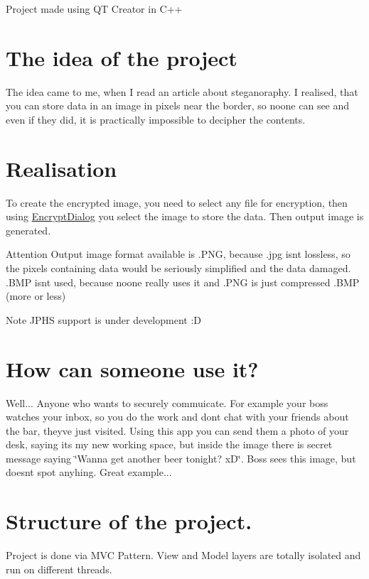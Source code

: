 Project made using QT Creator in C++\hypertarget{index_idea}{}\section{The idea of the project}\label{index_idea}
The idea came to me, when I read an article about steganoraphy. I realised, that you can store data in an image in pixels near the border, so noone can see and even if they did, it is practically impossible to decipher the contents. \hypertarget{index_real}{}\section{Realisation}\label{index_real}
To create the encrypted image, you need to select any file for encryption, then using \mbox{\hyperlink{class_encrypt_dialog}{Encrypt\+Dialog}} you select the image to store the data. Then output image is generated. \begin{DoxyAttention}{Attention}
Output image format available is .P\+NG, because .jpg isn\textquotesingle{}t lossless, so the pixels containing data would be seriously simplified and the data damaged. .B\+MP isn\textquotesingle{}t used, because noone really uses it and .P\+NG is just compressed .B\+MP (more or less) 
\end{DoxyAttention}
\begin{DoxyNote}{Note}
J\+P\+HS support is under development \+:D
\end{DoxyNote}
\hypertarget{index_use}{}\section{How can someone use it?}\label{index_use}
Well... Anyone who wants to securely commuicate. For example your boss watches your inbox, so you do the work and don\textquotesingle{}t chat with your friends about the bar, they\textquotesingle{}ve just visited. Using this app you can send them a photo of your desk, saying it\textquotesingle{}s my new working space, but inside the image there is secret message saying \char`\"{}\+Wanna get another beer tonight? x\+D\char`\"{}. Boss sees this image, but doesn\textquotesingle{}t spot anyhing. Great example... \hypertarget{index_structure}{}\section{Structure of the project.}\label{index_structure}
Project is done via M\+VC Pattern. View and Model layers are totally isolated and run on different threads.

